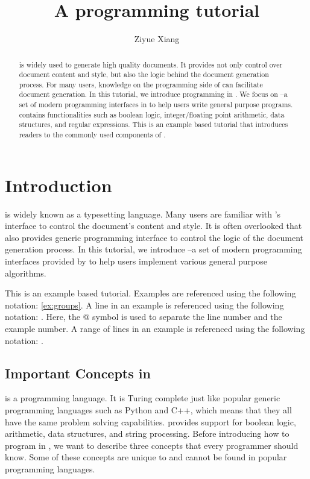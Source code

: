 \documentclass{ltugboat}
\title{A \LTT{} programming tutorial}
\author{Ziyue Xiang}
\begin{document}
\begin{abstract}
\LT{} is widely used to generate high quality documents.
It provides not only control over document content and style, but also the logic behind the document generation process.
For many users, knowledge on the programming side of \LT{} can facilitate document generation.
In this tutorial, we introduce programming in \LT{}.
We focus on \LTT{}--a set of modern programming interfaces in \LT{} to help users write general purpose programs.
\LTT{} contains functionalities such as boolean logic, integer/floating point arithmetic, data structures, and regular expressions.
This is an example based \LTT{} tutorial that introduces readers to the commonly used components of \LTT{}.
\end{abstract}

\maketitle

\tableofcontents
\ListOfCodeExample


\section{Introduction}

\LT{} is widely known as a typesetting language.
Many \LT{} users are familiar with \LT{}'s interface to control the document's content and style.
It is often overlooked that \LT{} also provides generic programming interface to control the logic of the document generation process.
In this tutorial, we introduce \LTT{}--a set of modern programming interfaces provided by \LT{} to help users implement various general purpose algorithms.

This is an example based tutorial. 
Examples are referenced using the following notation: \cref{ex:groups}.
A line in an example is referenced using the following notation: .
Here, the @ symbol is used to separate the line number and the example number.
A range of lines in an example is referenced using the following notation: .

\subsection{Important Concepts in \LT{}}\label{sec:important-concepts}

\LT{} is a programming language. 
It is Turing complete just like popular generic programming languages such as Python and C++, which means that they all have the same problem solving capabilities.
\LT{} provides support for boolean logic, arithmetic, data structures, and string processing.
Before introducing how to program in \LT{}, we want to describe three concepts that every \LT{} programmer should know.
Some of these concepts are unique to \LT{} and cannot be found in popular programming languages.
\end{document}
